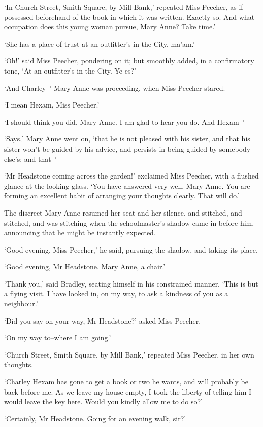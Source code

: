 ‘In Church Street, Smith Square, by Mill Bank,’ repeated Miss Peecher,
as if possessed beforehand of the book in which it was written. Exactly
so. And what occupation does this young woman pursue, Mary Anne? Take
time.’

‘She has a place of trust at an outfitter’s in the City, ma’am.’

‘Oh!’ said Miss Peecher, pondering on it; but smoothly added, in a
confirmatory tone, ‘At an outfitter’s in the City. Ye-es?’

‘And Charley--’ Mary Anne was proceeding, when Miss Peecher stared.

‘I mean Hexam, Miss Peecher.’

‘I should think you did, Mary Anne. I am glad to hear you do. And
Hexam--’

‘Says,’ Mary Anne went on, ‘that he is not pleased with his sister, and
that his sister won’t be guided by his advice, and persists in being
guided by somebody else’s; and that--’

‘Mr Headstone coming across the garden!’ exclaimed Miss Peecher, with a
flushed glance at the looking-glass. ‘You have answered very well, Mary
Anne. You are forming an excellent habit of arranging your thoughts
clearly. That will do.’

The discreet Mary Anne resumed her seat and her silence, and stitched,
and stitched, and was stitching when the schoolmaster’s shadow came in
before him, announcing that he might be instantly expected.

‘Good evening, Miss Peecher,’ he said, pursuing the shadow, and taking
its place.

‘Good evening, Mr Headstone. Mary Anne, a chair.’

‘Thank you,’ said Bradley, seating himself in his constrained manner.
‘This is but a flying visit. I have looked in, on my way, to ask a
kindness of you as a neighbour.’

‘Did you say on your way, Mr Headstone?’ asked Miss Peecher.

‘On my way to--where I am going.’

‘Church Street, Smith Square, by Mill Bank,’ repeated Miss Peecher, in
her own thoughts.

‘Charley Hexam has gone to get a book or two he wants, and will probably
be back before me. As we leave my house empty, I took the liberty of
telling him I would leave the key here. Would you kindly allow me to do
so?’

‘Certainly, Mr Headstone. Going for an evening walk, sir?’

